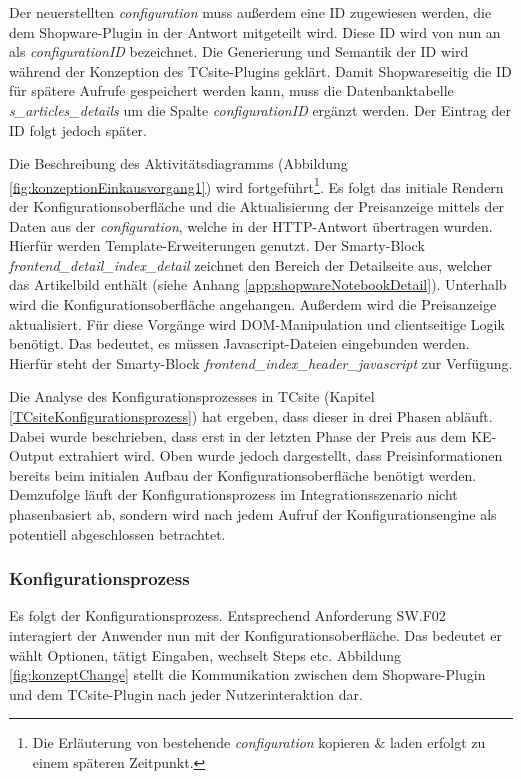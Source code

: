 \documentclass[11pt, a4paper, titlepage, listof=totoc, bibliography=totoc, index=totoc, twoside, openright, headings=normal]{scrreprt}
\begin{document}
Der neuerstellten \emph{configuration} muss außerdem eine ID zugewiesen werden, die dem Shopware-Plugin in der Antwort mitgeteilt wird. Diese ID wird von nun an als \emph{configurationID} bezeichnet. Die Generierung und Semantik der ID wird während der Konzeption des TCsite-Plugins geklärt. Damit Shopwareseitig die ID für spätere Aufrufe gespeichert werden kann, muss die Datenbanktabelle \emph{s\_articles\_details} um die Spalte \emph{configurationID} ergänzt werden. Der Eintrag der ID folgt jedoch später.

Die Beschreibung des Aktivitätsdiagramms (Abbildung \ref{fig:konzeptionEinkausvorgang1}) wird fortgeführt\footnote{Die Erläuterung von \glqq bestehende \emph{configuration} kopieren \& laden\grqq{} erfolgt zu einem späteren Zeitpunkt.}. Es folgt das initiale Rendern der Konfigurationsoberfläche und die Aktualisierung der Preisanzeige mittels der Daten aus der \emph{configuration}, welche in der HTTP-Antwort übertragen wurden. Hierfür werden Template-Erweiterungen genutzt. Der Smarty-Block \emph{frontend\_detail\_index\_detail} zeichnet den Bereich der Detailseite aus, welcher das Artikelbild enthält (siehe Anhang \ref{app:shopwareNotebookDetail}). Unterhalb wird die Konfigurationsoberfläche angehangen. Außerdem wird die Preisanzeige aktualisiert. Für diese Vorgänge wird DOM-Manipulation und clientseitige Logik benötigt. Das bedeutet, es müssen Javascript-Dateien eingebunden werden. Hierfür steht der Smarty-Block \emph{frontend\_index\_header\_javascript} zur Verfügung.

Die Analyse des Konfigurationsprozesses in TCsite (Kapitel \ref{TCsiteKonfigurationsprozess}) hat ergeben, dass dieser in drei Phasen abläuft. Dabei wurde beschrieben, dass erst in der letzten Phase der Preis aus dem KE-Output extrahiert wird. Oben wurde jedoch dargestellt, dass Preisinformationen bereits beim initialen Aufbau der Konfigurationsoberfläche benötigt werden. Demzufolge läuft der Konfigurationsprozess im Integrationsszenario nicht phasenbasiert ab, sondern wird nach jedem Aufruf der Konfigurationsengine als potentiell abgeschlossen betrachtet.

\subsubsection*{Konfigurationsprozess}
Es folgt der Konfigurationsprozess. Entsprechend Anforderung SW.F02 interagiert der Anwender nun mit der Konfigurationsoberfläche. Das bedeutet er wählt Optionen, tätigt Eingaben, wechselt Steps etc. Abbildung \ref{fig:konzeptChange} stellt die Kommunikation zwischen dem Shopware-Plugin und dem TCsite-Plugin nach jeder Nutzerinteraktion dar.
\end{document}
